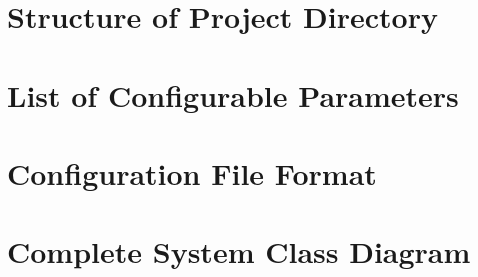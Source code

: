 \documentclass[12pt,a4paper]{report}
\begin{document}
\onehalfspacing

\appendix
\chapter{Structure of Project Directory}
\label{appendix:directory}


\chapter{List of Configurable Parameters}
\label{appendix:parameters}


\chapter{Configuration File Format}
\label{appendix:configuration}


\chapter{Complete System Class Diagram}
\label{appendix:class_diagram}

\end{document}
